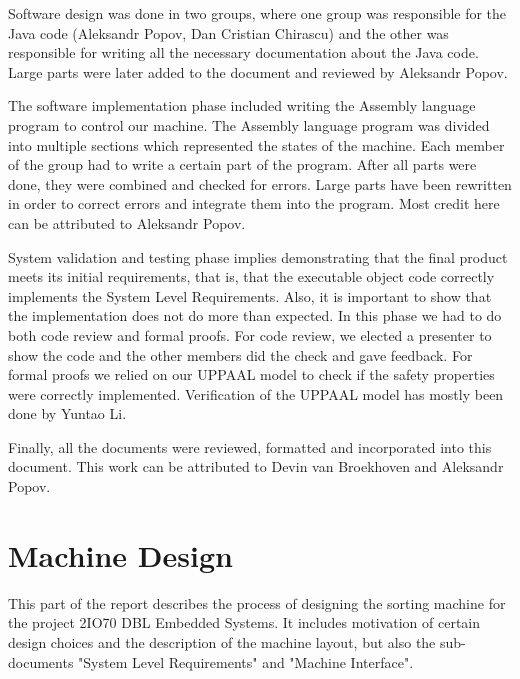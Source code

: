 \documentclass[a4paper,oneside,11pt]{report}
\begin{document}
Software design was done in two groups, where one group was responsible for the Java code (Aleksandr Popov, Dan Cristian Chirascu) and the other was responsible for writing all the necessary documentation about the Java code. Large parts were later added to the document and reviewed by Aleksandr Popov.

The software implementation phase included writing the Assembly language program to control our machine. The Assembly language program was divided into multiple sections which represented the states of the machine. Each member of the group had to write a certain part of the program. After all parts were done, they were combined and checked for errors. Large parts have been rewritten in order to correct errors and integrate them into the program. Most credit here can be attributed to Aleksandr Popov.

System validation and testing phase implies demonstrating that the final product meets its initial requirements, that is, that the executable object code correctly implements the System Level Requirements. Also, it is important to show that the implementation does not do more than expected. In this phase we had to do both code review and formal proofs. For code review, we elected a presenter to show the code and the other members did the check and gave feedback. For formal proofs we relied on our UPPAAL model to check if the safety properties were correctly implemented. Verification of the UPPAAL model has mostly been done by Yuntao Li.

Finally, all the documents were reviewed, formatted and incorporated into this document. This work can be attributed to Devin van Broekhoven and Aleksandr Popov.

\chapter{Machine Design}
This part of the report describes the process of designing the sorting machine for the project 2IO70 DBL Embedded Systems. It includes motivation of certain design choices and the description of the machine layout, but also the sub-documents "System Level Requirements" and "Machine Interface".
\end{document}
